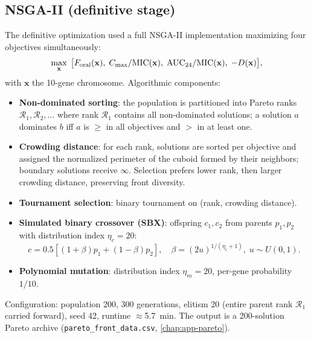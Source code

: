 \subsection{NSGA-II (definitive stage)}
\label{sec:nsga2}
The definitive optimization used a full NSGA-II implementation \citep{Deb2002} maximizing four objectives simultaneously:
\begin{equation}
\max_{\mathbf{x}} \; \big[F_{\mathrm{oral}}(\mathbf{x}),\; C_{\max}/\mathrm{MIC}(\mathbf{x}),\; \mathrm{AUC}_{24}/\mathrm{MIC}(\mathbf{x}),\; -D(\mathbf{x})\big],
\label{eq:nsga-objectives}
\end{equation}
with $\mathbf{x}$ the 10-gene chromosome. Algorithmic components:
\begin{itemize}
\item \textbf{Non-dominated sorting}: the population is partitioned into Pareto ranks $\mathcal{R}_1, \mathcal{R}_2, \dots$ where rank $\mathcal{R}_1$ contains all non-dominated solutions; a solution $a$ dominates $b$ iff $a$ is $\geq$ in all objectives and $>$ in at least one.
\item \textbf{Crowding distance}: for each rank, solutions are sorted per objective and assigned the normalized perimeter of the cuboid formed by their neighbors; boundary solutions receive $\infty$. Selection prefers lower rank, then larger crowding distance, preserving front diversity.
\item \textbf{Tournament selection}: binary tournament on (rank, crowding distance).
\item \textbf{Simulated binary crossover (SBX)}: offspring $c_1, c_2$ from parents $p_1, p_2$ with distribution index $\eta_c = 20$:
\begin{equation}
c = 0.5\left[(1+\beta)p_1 + (1-\beta)p_2\right], \quad
\beta = \left(2u\right)^{1/(\eta_c+1)},\; u \sim U(0,1).
\end{equation}
\item \textbf{Polynomial mutation}: distribution index $\eta_m = 20$, per-gene probability $1/10$.
\end{itemize}
Configuration: population 200, 300 generations, elitism 20 (entire parent rank $\mathcal{R}_1$ carried forward), seed 42, runtime $\approx$5.7~min. The output is a 200-solution Pareto archive (\texttt{pareto\_front\_data.csv}, \cref{chap:app-pareto}).

